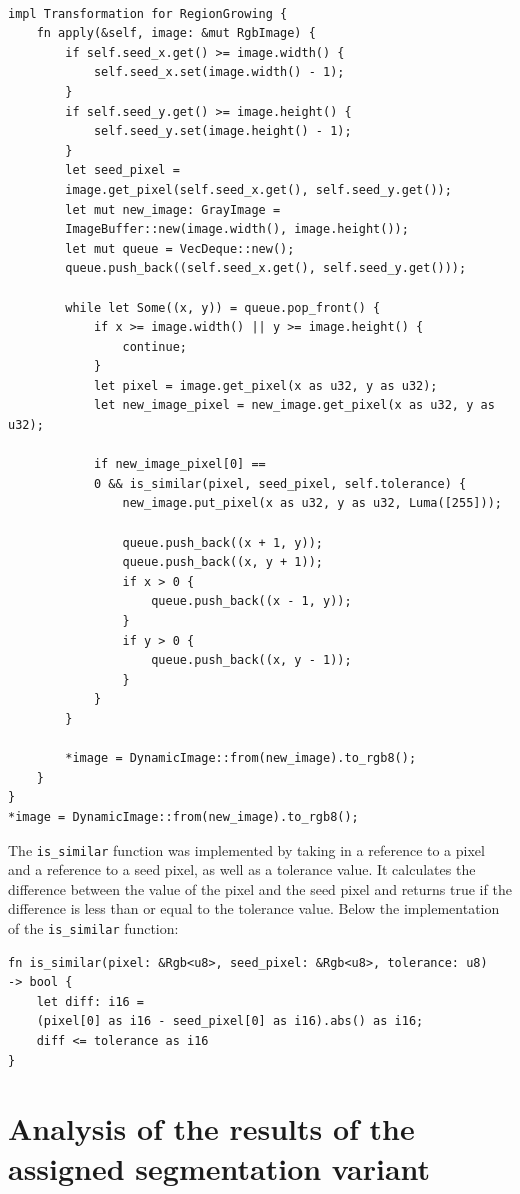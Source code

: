 \documentclass[12pt]{article}
\begin{document}
\begin{lstlisting}
    
impl Transformation for RegionGrowing {
    fn apply(&self, image: &mut RgbImage) {
        if self.seed_x.get() >= image.width() {
            self.seed_x.set(image.width() - 1);
        }
        if self.seed_y.get() >= image.height() {
            self.seed_y.set(image.height() - 1);
        }
        let seed_pixel = 
        image.get_pixel(self.seed_x.get(), self.seed_y.get());
        let mut new_image: GrayImage = 
        ImageBuffer::new(image.width(), image.height());
        let mut queue = VecDeque::new();
        queue.push_back((self.seed_x.get(), self.seed_y.get()));

        while let Some((x, y)) = queue.pop_front() {
            if x >= image.width() || y >= image.height() {
                continue;
            }
            let pixel = image.get_pixel(x as u32, y as u32);
            let new_image_pixel = new_image.get_pixel(x as u32, y as u32);

            if new_image_pixel[0] == 
            0 && is_similar(pixel, seed_pixel, self.tolerance) {
                new_image.put_pixel(x as u32, y as u32, Luma([255]));

                queue.push_back((x + 1, y));
                queue.push_back((x, y + 1));
                if x > 0 {
                    queue.push_back((x - 1, y));
                }
                if y > 0 {
                    queue.push_back((x, y - 1));
                }
            }
        }

        *image = DynamicImage::from(new_image).to_rgb8();
    }
}
*image = DynamicImage::from(new_image).to_rgb8();
\end{lstlisting}

The \lstinline{is_similar} function was implemented by taking in a reference to a pixel
and a reference to a seed pixel,
as well as a tolerance value.
It calculates the difference between the value of the pixel
and the seed pixel and returns true if the difference is less than or equal
to the tolerance value. Below the implementation of the \lstinline{is_similar} function:

\begin{lstlisting}
fn is_similar(pixel: &Rgb<u8>, seed_pixel: &Rgb<u8>, tolerance: u8) 
-> bool {
    let diff: i16 = 
    (pixel[0] as i16 - seed_pixel[0] as i16).abs() as i16;
    diff <= tolerance as i16
}
\end{lstlisting}

\section{Analysis of the results of the assigned segmentation variant}
\end{document}
